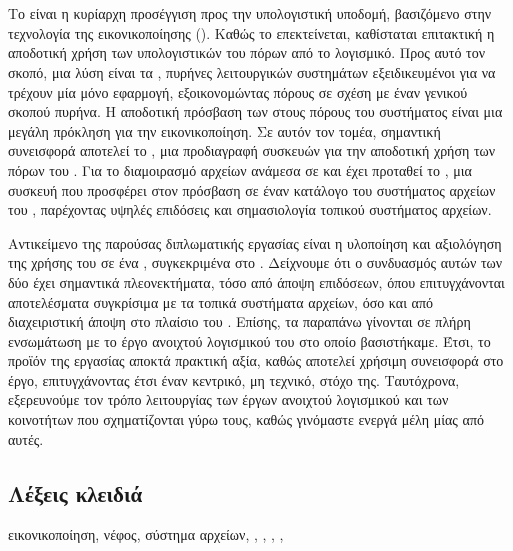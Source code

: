 \chapter*{\abstractname}

Το  είναι η κυρίαρχη προσέγγιση προς την υπολογιστική
υποδομή, βασιζόμενο στην τεχνολογία της εικονικοποίησης ().
Καθώς το  επεκτείνεται, καθίσταται επιτακτική η αποδοτική χρήση των
υπολογιστικών του πόρων από το λογισμικό. Προς αυτό τον σκοπό, μια λύση είναι τα
\emph{}, πυρήνες λειτουργικών συστημάτων εξειδικευμένοι για να
τρέχουν μία μόνο εφαρμογή, εξοικονομώντας πόρους σε σχέση με έναν γενικού σκοπού
πυρήνα. Η αποδοτική πρόσβαση των  στους πόρους του
\host{} συστήματος είναι μια μεγάλη πρόκληση για την εικονικοποίηση. Σε αυτόν
τον τομέα, σημαντική συνεισφορά αποτελεί το \emph{}, μια προδιαγραφή
 συσκευών για την αποδοτική χρήση των πόρων του \host{}.
Για το διαμοιρασμό αρχείων ανάμεσα σε \host{} και \guest{} έχει προταθεί το
\emph{\viofs{}}, μια  συσκευή που προσφέρει στον \guest{} πρόσβαση σε
έναν κατάλογο του συστήματος αρχείων του \host{}, παρέχοντας υψηλές επιδόσεις
και σημασιολογία τοπικού συστήματος αρχείων.

Αντικείμενο της παρούσας διπλωματικής εργασίας είναι η υλοποίηση και αξιολόγηση
της χρήσης του \viofs{} σε ένα , συγκεκριμένα στο \osv{}.
Δείχνουμε ότι ο συνδυασμός αυτών των δύο έχει σημαντικά πλεονεκτήματα, τόσο από
άποψη επιδόσεων, όπου επιτυγχάνονται αποτελέσματα συγκρίσιμα με τα τοπικά
συστήματα αρχείων, όσο και από διαχειριστική άποψη στο πλαίσιο του .
Επίσης, τα παραπάνω γίνονται σε πλήρη ενσωμάτωση με το έργο ανοιχτού λογισμικού
του  στο οποίο βασιστήκαμε. Έτσι, το προϊόν της εργασίας αποκτά
πρακτική αξία, καθώς αποτελεί χρήσιμη συνεισφορά στο έργο, επιτυγχάνοντας έτσι
έναν κεντρικό, μη τεχνικό, στόχο της. Ταυτόχρονα, εξερευνούμε τον τρόπο
λειτουργίας των έργων ανοιχτού λογισμικού και των κοινοτήτων που σχηματίζονται
γύρω τους, καθώς γινόμαστε ενεργά μέλη μίας από αυτές.

\section*{Λέξεις κλειδιά}
\noindent
εικονικοποίηση, νέφος, σύστημα αρχείων, , , \osv{},
\viofs{}, \qemu{}

